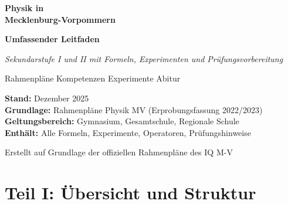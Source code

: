 \documentclass[11pt,a4paper]{article}
\begin{document}
\begin{titlepage}
\centering
\vspace*{2.5cm}
{\Huge\bfseries\color{physikblue} Physik in\\[0.3em]Mecklenburg-Vorpommern\par}
\vspace{0.6cm}
{\LARGE\bfseries Umfassender Leitfaden\par}
\vspace{0.4cm}
{\large\textit{Sekundarstufe I und II mit Formeln, Experimenten und Prüfungsvorbereitung}\par}
\vspace{0.5cm}
{\large Rahmenpläne \textbullet{} Kompetenzen \textbullet{} Experimente \textbullet{} Abitur\par}
\vspace{1.5cm}

\begin{tcolorbox}[colback=lightgray, colframe=lightgray, width=13cm, boxrule=0pt]
\textbf{Stand:} Dezember 2025\\[0.2em]
\textbf{Grundlage:} Rahmenpläne Physik MV (Erprobungsfassung 2022/2023)\\[0.2em]
\textbf{Geltungsbereich:} Gymnasium, Gesamtschule, Regionale Schule\\[0.2em]
\textbf{Enthält:} Alle Formeln, Experimente, Operatoren, Prüfungshinweise
\end{tcolorbox}

\vspace{1.5cm}

\vfill
{\small Erstellt auf Grundlage der offiziellen Rahmenpläne des IQ M-V\par}
\end{titlepage}

\tableofcontents
\newpage

\part*{Teil I: Übersicht und Struktur}
\end{document}
